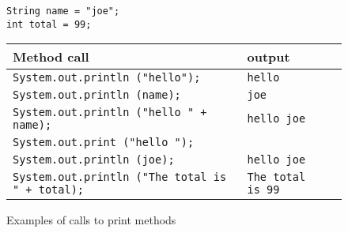 




\begin {figure}

\begin {verbatim}
String name = "joe";
int total = 99;
\end{verbatim}

\begin{tabular} {l l l  }
Method call 		&    output   							\\
\hline
\texttt{System.out.println ("hello"); }		&	\texttt{hello}	  		\\
\texttt{System.out.println (name); }		&	\texttt{joe}	  		\\
\texttt{System.out.println ("hello " + name); }	&	\texttt{hello joe}	  	\\
\texttt{System.out.print ("hello "); }		&					\\
\texttt{System.out.println (joe); }		&	\texttt{hello joe}	  	\\
\texttt{System.out.println ("The total is " + total);}
						&	\texttt{The total is 99}  	\\

\end {tabular}

\caption {Examples of calls to print methods}

\label {fig:print}

\end {figure}


